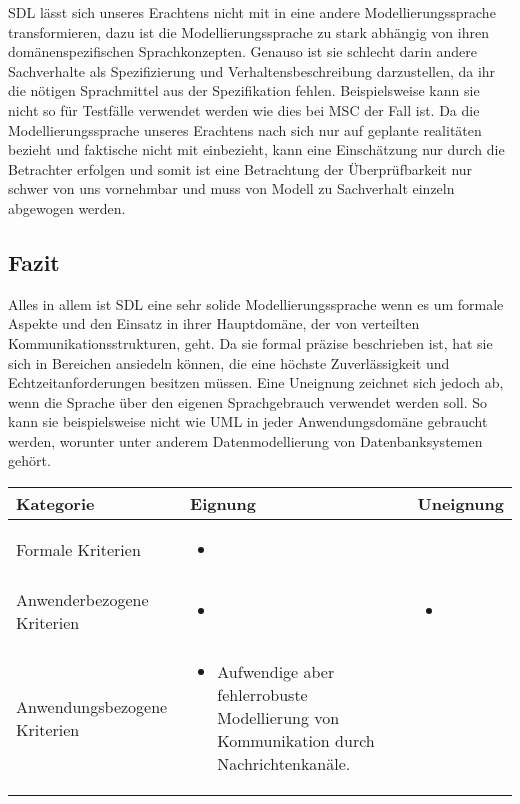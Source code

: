 \ac{SDL} lässt sich unseres Erachtens nicht mit in eine andere Modellierungssprache transformieren, dazu ist die Modellierungssprache zu stark abhängig von ihren domänenspezifischen Sprachkonzepten. Genauso ist sie schlecht darin andere Sachverhalte als Spezifizierung und Verhaltensbeschreibung darzustellen, da ihr die nötigen Sprachmittel aus der Spezifikation fehlen. Beispielsweise kann sie nicht so für Testfälle verwendet werden wie dies bei \ac{MSC} der Fall ist.
Da die Modellierungssprache unseres Erachtens nach sich nur auf geplante realitäten bezieht und faktische nicht mit einbezieht, kann eine Einschätzung nur durch die Betrachter erfolgen und somit ist eine Betrachtung der Überprüfbarkeit nur schwer von uns vornehmbar und muss von Modell zu Sachverhalt einzeln abgewogen werden.

\subsection{Fazit}
\label{scc:SDL_Fazit}
Alles in allem ist \ac{SDL} eine sehr solide Modellierungssprache wenn es um formale Aspekte und den Einsatz in ihrer Hauptdomäne, der von verteilten Kommunikationsstrukturen, geht. Da sie formal präzise beschrieben ist, hat sie sich in Bereichen ansiedeln können, die eine höchste Zuverlässigkeit und Echtzeitanforderungen besitzen müssen. Eine Uneignung zeichnet sich jedoch ab, wenn die Sprache über den eigenen Sprachgebrauch verwendet werden soll. So kann sie beispielsweise nicht wie \ac{UML} in jeder Anwendungsdomäne gebraucht werden, worunter unter anderem Datenmodellierung von Datenbanksystemen gehört.  

\begin{tabularx}{\textwidth}{|l|X|X|}
	\hline
	Kategorie & Eignung & Uneignung  \\
	\hline
	Formale Kriterien	&
	\begin{itemize}
		\item 
	\end{itemize} & \\
	\hline
	Anwenderbezogene Kriterien &
	\begin{itemize}
		\item
		\end{itemize}  & 
	\begin{itemize}
		\item 
	\end{itemize} \\
	\hline
	Anwendungsbezogene Kriterien &
	\begin{itemize}
		\item Aufwendige aber fehlerrobuste	Modellierung von Kommunikation durch Nachrichtenkanäle.
	\end{itemize}   & \\
	\hline
\end{tabularx} 
